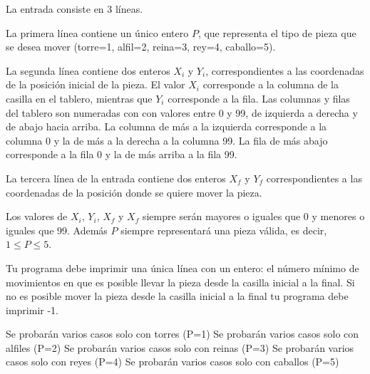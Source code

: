 \documentclass{oci}
\begin{document}
\begin{inputDescription}
  La entrada consiste en 3 líneas.
  
  La primera línea contiene un único entero $P$, que representa el tipo de pieza que se desea mover (torre=1, alfil=2, reina=3, rey=4, caballo=5).
  
  La segunda línea contiene dos enteros $X_{i}$ y $Y_{i}$, correspondientes a las coordenadas de la posición inicial de la pieza.
  El valor $X_{i}$ corresponde a la columna de la casilla en el tablero, mientras que $Y_{i}$ corresponde a la fila.
  Las columnas y filas del tablero son numeradas con con valores entre 0 y 99, de izquierda a derecha y de abajo hacia arriba.
  La columna de más a la izquierda corresponde a la columna 0 y la de más a la derecha a la columna 99.
  La fila de más abajo corresponde a la fila 0 y la de más arriba a la fila 99.
  
  La tercera línea de la entrada contiene dos enteros $X_{f}$ y $Y_{f}$ correspondientes a las coordenadas de la posición donde se quiere mover la pieza.
  
  Los valores de $X_i$, $Y_i$, $X_f$ y $X_f$ siempre serán mayores o iguales que 0 y menores o iguales que 99.
  Además $P$ siempre representará una pieza válida, es decir, $1 \le P \le 5$.
\end{inputDescription}

\begin{outputDescription}
  Tu programa debe imprimir una única línea con un entero: el número mínimo de movimientos en que es posible llevar la pieza desde la casilla inicial a la final.
  Si no es posible mover la pieza desde la casilla inicial a la final tu programa debe imprimir -1.
\end{outputDescription}

\begin{scoreDescription}
   Se probarán varios casos solo con torres (P=1)
   Se probarán varios casos solo con alfiles (P=2)
   Se probarán varios casos solo con reinas (P=3)
   Se probarán varios casos solo con reyes (P=4)
   Se probarán varios casos solo con caballos (P=5)
\end{scoreDescription}

\begin{sampleDescription}
\end{sampleDescription}
\end{document}
